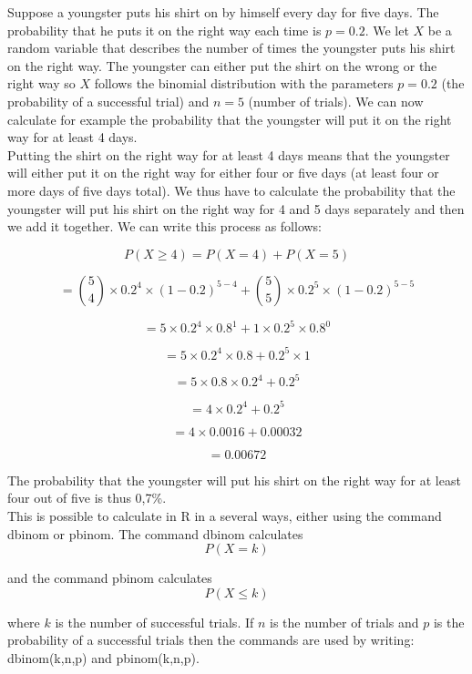 \documentclass[12pt,a4paper]{article}
\theoremstyle{regla}
\theoremstyle{remark}
\theoremstyle{definition}
\theoremstyle{nonumberbreak}
\begin{document}
\begin{xmpl} 
Suppose a youngster puts his shirt on by himself every day for five days. The probability that he puts it on the right way each time is $p=0.2$. We let $X$ be a random variable that describes the number of times the youngster puts his shirt on the right way. The youngster can either put the shirt on the wrong or the right way so $X$ follows the binomial distribution with the parameters $p=0.2$ (the probability of a successful trial) and $n=5$ (number of trials). We can now calculate for example the probability that the youngster will put it on the right way for at least 4 days.\\

Putting the shirt on the right way for at least 4 days means that the youngster will either put it on the right way for either four or five days (at least four or more days of five days total). We thus have to calculate the probability that the youngster will put his shirt on the right way for 4 and 5 days separately and then we add it together. We can write this process as follows:

$$P(X\geq4) = P(X=4) + P(X=5)$$

$$= \binom{5}{4}\times0.2^4\times(1-0.2)^{5-4} + \binom{5}{5}\times0.2^5\times(1-0.2)^{5-5}$$

$$= 5\times0.2^4\times0.8^1 + 1\times0.2^5\times0.8^0$$

$$= 5\times0.2^4\times0.8 + 0.2^5\times1$$

$$= 5\times0.8 \times0.2^4 + 0.2^5 $$

$$= 4\times0.2^4 + 0.2^5$$

 

$$= 4\times0.0016 + 0.00032$$

$$= 0.00672$$

The probability that the youngster will put his shirt on the right way for at least four out of five is thus 0,7\%.\\

This is possible to calculate in R in a several ways, either using the command dbinom or pbinom. The command dbinom calculates $$P(X = k)$$

and the command pbinom calculates $$P(X \leq k)$$

where $k$ is the number of successful trials. If $n$ is the number of trials and $p$ is the probability of a successful trials then the commands are used by writing: dbinom(k,n,p) and pbinom(k,n,p).\\


\end{xmpl}
\end{document}
